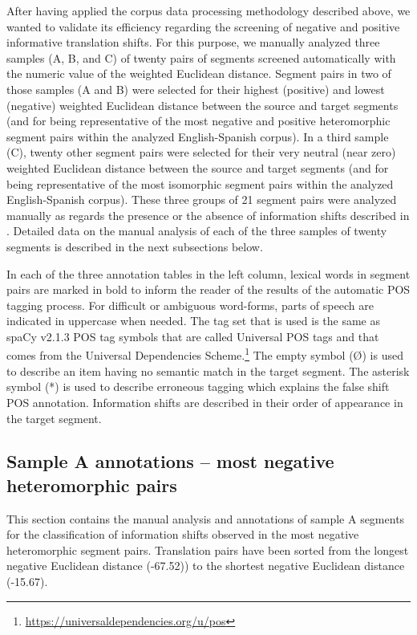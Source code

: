 \documentclass[output=paper]{langsci/langscibook}
\begin{document}
After having applied the corpus data processing methodology described above, we wanted to validate its efficiency regarding the screening of negative and positive informative translation shifts. For this purpose, we manually analyzed three samples (A, B, and C) of twenty pairs of segments screened automatically with the numeric value of the weighted Euclidean distance. Segment pairs in two of those samples (A and B) were selected for their highest (positive) and lowest (negative) weighted Euclidean distance between the source and target segments (and for being representative of the most negative and positive heteromorphic segment pairs within the analyzed English-Spanish corpus). In a third sample (C), twenty other segment pairs were selected for their very neutral (near zero) weighted Euclidean distance between the source and target segments (and for being representative of the most isomorphic segment pairs within the analyzed English-Spanish corpus). These three groups of 21 segment pairs were analyzed manually as regards the presence or the absence of information shifts described in . Detailed data on the manual analysis of each of the three samples of twenty segments is described in the next subsections below.

In each of the three annotation tables in the left column, lexical words in segment pairs are marked in bold to inform the reader of the results of the automatic POS tagging process. For difficult or ambiguous word-forms, parts of speech are indicated in uppercase when needed. The tag set that is used is the same as spaCy v2.1.3 POS tag symbols that are called Universal POS tags and that comes from the Universal Dependencies Scheme.\footnote{\url{https://universaldependencies.org/u/pos}} The empty symbol (Ø) is used to describe an item having no semantic match in the target segment. The asterisk symbol (*) is used to describe erroneous tagging which explains the false shift POS annotation. Information shifts are described in their order of appearance in the target segment.

\subsection{Sample A annotations -- most negative heteromorphic pairs}\label{ep:saa}

This section contains the manual analysis and annotations of sample A segments for the classification of information shifts observed in the most negative heteromorphic segment pairs. Translation pairs have been sorted from the longest negative Euclidean distance (-67.52)) to the shortest negative Euclidean distance (-15.67).
\end{document}
